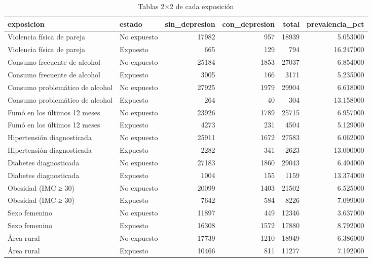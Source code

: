 \begin{table}[htbp]
\caption{Tablas 2×2 de cada exposición}
\label{tab:tabla_13_tablas_2x2}
\begin{tabular}{llrrrr}
\toprule
exposicion & estado & sin\_depresion & con\_depresion & total & prevalencia\_pct \\
\midrule
Violencia física de pareja & No expuesto & 17982 & 957 & 18939 & 5.053000 \\
Violencia física de pareja & Expuesto & 665 & 129 & 794 & 16.247000 \\
Consumo frecuente de alcohol & No expuesto & 25184 & 1853 & 27037 & 6.854000 \\
Consumo frecuente de alcohol & Expuesto & 3005 & 166 & 3171 & 5.235000 \\
Consumo problemático de alcohol & No expuesto & 27925 & 1979 & 29904 & 6.618000 \\
Consumo problemático de alcohol & Expuesto & 264 & 40 & 304 & 13.158000 \\
Fumó en los últimos 12 meses & No expuesto & 23926 & 1789 & 25715 & 6.957000 \\
Fumó en los últimos 12 meses & Expuesto & 4273 & 231 & 4504 & 5.129000 \\
Hipertensión diagnosticada & No expuesto & 25911 & 1672 & 27583 & 6.062000 \\
Hipertensión diagnosticada & Expuesto & 2282 & 341 & 2623 & 13.000000 \\
Diabetes diagnosticada & No expuesto & 27183 & 1860 & 29043 & 6.404000 \\
Diabetes diagnosticada & Expuesto & 1004 & 155 & 1159 & 13.374000 \\
Obesidad (IMC ≥ 30) & No expuesto & 20099 & 1403 & 21502 & 6.525000 \\
Obesidad (IMC ≥ 30) & Expuesto & 7642 & 584 & 8226 & 7.099000 \\
Sexo femenino & No expuesto & 11897 & 449 & 12346 & 3.637000 \\
Sexo femenino & Expuesto & 16308 & 1572 & 17880 & 8.792000 \\
Área rural & No expuesto & 17739 & 1210 & 18949 & 6.386000 \\
Área rural & Expuesto & 10466 & 811 & 11277 & 7.192000 \\
\bottomrule
\end{tabular}
\end{table}
